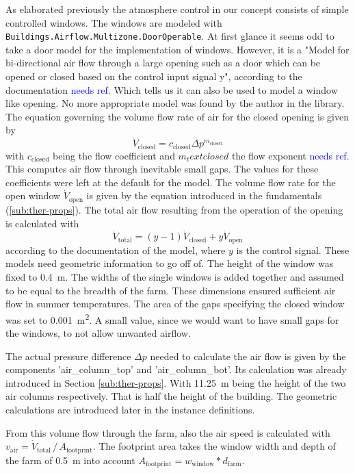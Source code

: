 As elaborated previously the atmosphere control in our concept consists of simple controlled windows.
The windows are modeled with \lstinline{Buildings.Airflow.Multizone.DoorOperable}.
At first glance it seems odd to take a door model for the implementation of windows.
However, it is a "Model for bi-directional air flow through a large opening such as a door which can be opened or closed based on the control input signal y", according to the documentation \textcolor{Blue}{needs ref}.
Which tells us it can also be used to model a window like opening.
No more appropriate model was found by the author in the library.
The equation governing the volume flow rate of air for the closed opening is given by
$$
\dot{V}_\text{closed} = c_\text{closed} \Delta p ^ {m_\text{closed}}
$$
with $c_\text{closed}$ being the flow coefficient and $m_text{closed}$ the flow exponent \textcolor{Blue}{needs ref}.
This computes air flow through inevitable small gaps.
The values for these coefficients were left at the default for the model.
The volume flow rate for the open window $\dot{V}_\text{open}$ is given by the equation introduced in the fundamentals (\ref{sub:ther-props}).
The total air flow resulting from the operation of the opening is calculated with
$$
\dot{V}_\text{total} = (y-1)\dot{V}_\text{closed} + y \dot{V}_\text{open}
$$
according to the documentation of the model, where $y$ is the control signal.
These models need geometric information to go off of.
The height of the window was fixed to \SI{0.4}{\m}.
The widths of the single windows is added together and assumed to be equal to the breadth of the farm.
These dimensions ensured sufficient air flow in summer temperatures.
The area of the gaps specifying the closed window was set to \SI{0.001}{\square\m}.
A small value, since we would want to have small gaps for the windows, to not allow unwanted airflow.

The actual pressure difference $\Delta p$ needed to calculate the air flow is given by the components 'air\_column\_top' and 'air\_column\_bot'.
Its calculation was already introduced in Section \ref{sub:ther-props}.
With \SI{11.25}{\m} being the height of the two air columns respectively.
That is half the height of the building.
The geometric calculations are introduced later in the instance definitions.

From this volume flow through the farm, also the air speed is calculated with $v_\text{air} = \dot{V}_\text{total}\, / \, A_\text{footprint}$.
The footprint area takes the window width and depth of the farm of \SI{0.5}{\m} into account $A_\text{footprint} = w_\text{window} * d_\text{farm}$.

